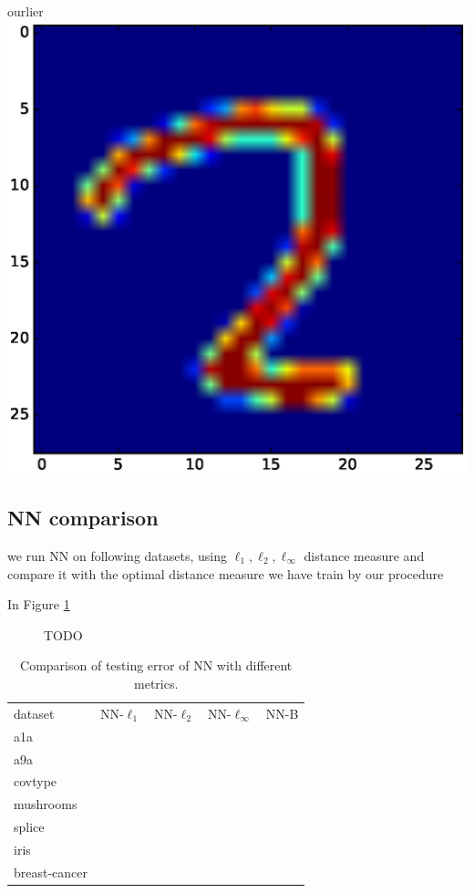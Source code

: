 \documentclass{article}
\begin{document}
ourlier
\includegraphics[scale=.1]{fig/MNIST120.eps}










\clearpage
\subsection{NN comparison}

we run NN
on following datasets, using 
$\ell_1, \ell_2, \ell_\infty$ distance measure
and compare it with the optimal distance measure we have train by our procedure


In Figure \ref{fig:NN-exp}
\begin{figure}[h!]

\caption{TODO}
\label{fig:NN-exp}


\end{figure}




\begin{table}[h!]
\caption{Comparison of testing error of NN with different metrics.}
\label{tbl:BD-NN}
\begin{tabular}{l|r|r|r|r}
dataset & NN-$\ell_1$ 
		& NN-$\ell_2$
		& NN-$\ell_\infty$
        & NN-B
\\        
a1a
\\
a9a
\\
covtype
\\
mushrooms
\\
splice
\\
iris
\\
breast-cancer
\end{tabular}



\end{table}
\end{document}
